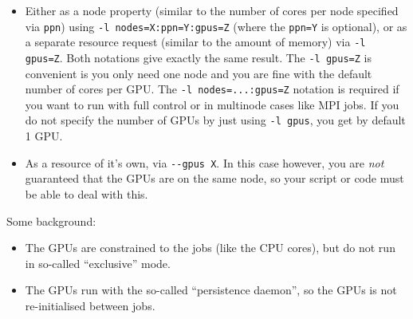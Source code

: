 \begin{itemize}
  \item Either as a node property (similar to the number of cores
  per node specified via \lstinline|ppn|) using \lstinline|-l nodes=X:ppn=Y:gpus=Z| (where the \lstinline|ppn=Y| is optional),
  or as a separate resource request (similar to the amount of memory) via \lstinline|-l gpus=Z|.
  Both notations give exactly the same result.
  The \lstinline|-l gpus=Z| is convenient is you only need one
  node and you are fine with the default number of cores per GPU.
  The \lstinline|-l nodes=...:gpus=Z| notation is required if you want to run with full control or in multinode cases like MPI jobs.
  If you do not specify the number of GPUs by just using \lstinline|-l gpus|, you get by default 1 GPU.
\item As a resource of it's own, via \lstinline|--gpus X|.
  In this case however, you are \emph{not} guaranteed that the GPUs are on the same node,
  so your script or code must be able to deal with this.
\end{itemize}

Some background:
\begin{itemize}
\item The GPUs are constrained to the jobs (like the CPU cores), but do not run in so-called ``exclusive'' mode.
\item The GPUs run with the so-called ``persistence daemon'', so the GPUs is not re-initialised between jobs.
\end{itemize}


